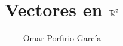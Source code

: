 




\newcommand\course{Precálculo}
\newcommand\Informationa{Omar Porfirio García}



\author{Omar Porfirio García}

\title{Vectores en $\rmath[2]$}
\subtitle{}